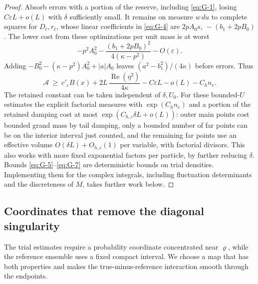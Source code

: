 \begin{proof}
Absorb errors with a portion of the reserve, including \eqref{eq:G-1}, losing \(C\varepsilon L+o(L)\) with \(\delta\) sufficiently small. It remains on measure \(w\,du\) to complete squares for \(D_\ell,r_\ell\), whose linear coefficients in \eqref{eq:G-4} are \(2p A_0 s,\ -(b_1+2p B_0)\). The lower cost from these optimizations per unit mass is at worst
\[
 -p^2 A_0^2-\frac{(b_1+2p B_0)^2}{4(\kappa-p^2)}-O(\varepsilon).
\]
Adding \(-B_0^2-(\kappa-p^2)A_0^2+|a| A_0\) leaves \((a^2-b_1^2)/(4\kappa)\) before errors. Thus
\begin{equation}
 \mathcal A\ \ge\ c'_\varepsilon B(x)+2L\,\frac{\operatorname{Re}(\eta^2)}{4\kappa}
 -C\varepsilon L-o(L)-C_h n_e.
 \label{eq:G-7}
\end{equation}
The retained constant can be taken independent of \(\delta,U_0\). For these bounded-\(U\) estimates the explicit factorial measures with \(\exp(C_h n_e)\) and a portion of the retained damping cost at most \(\exp(C_{h,\varepsilon}\delta L+o(L))\): outer main points cost bounded grand mass by tail damping, only a bounded number of far points can be on the interior interval just counted, and the remaining far points use an effective volume \(O(\delta L)+O_{h,\varepsilon}(1)\) per variable, with factorial divisors. This also works with more fixed exponential factors per particle, by further reducing \(\delta\). Bounds \eqref{eq:G-5}–\eqref{eq:G-7} are deterministic bounds on trial densities. Implementing them for the complex integrals, including fluctuation determinants and the discreteness of \(M\), takes further work below.


\end{proof}

\subsection{Coordinates that remove the diagonal singularity}

The trial estimates require a probability coordinate concentrated near
\(\varrho\), while the reference ensemble uses a fixed compact
interval. We choose a map that has both properties and makes the
true-minus-reference interaction smooth through the endpoints.

